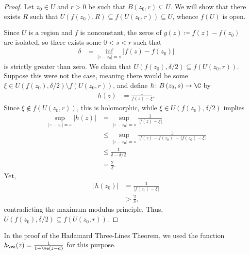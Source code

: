 \documentclass[10pt]{mypackage}
\begin{document}
\begin{proof}
  Let $z_0\in U$ and $r > 0$ be such that $ B\left( z_0,r \right)\subseteq U $. We will show that there exists $R$ such that $U\left( f\left( z_0 \right),R \right)\subseteq f\left( U\left( z_0,r \right) \right)\subseteq U$, whence $f(U)$ is open.\newline

  Since $U$ is a region and $f$ is nonconstant, the zeros of $g(z)\coloneq f(z) - f\left( z_0 \right)$ are isolated, so there exists some $0 < s < r$ such that
  \begin{align*}
    \delta &= \inf_{\left\vert z-z_0 \right\vert = s} \left\vert f(z)-f\left( z_0 \right) \right\vert
  \end{align*}
  is strictly greater than zero. We claim that $U\left( f\left( z_0 \right),\delta/2 \right) \subseteq f\left( U\left( z_0,r \right) \right)$. Suppose this were not the case, meaning there would be some $\xi\in U\left( f\left( z_0 \right),\delta/2 \right)\setminus f\left( U\left( z_0,r \right) \right)$, and define $ h\colon B\left( z_0,s \right)\rightarrow \C $ by
  \begin{align*}
    h(z) &= \frac{1}{f\left( z \right) - \xi}.
  \end{align*}
  Since $\xi\notin f\left( U\left( z_0,r \right) \right)$, this is holomorphic, while $\xi\in U\left( f\left( z_0 \right),\delta/2 \right)$ implies
  \begin{align*}
    \sup_{\left\vert z-z_0 \right\vert = s} \left\vert h(z) \right\vert &= \sup_{\left\vert z-z_0 \right\vert = s} \frac{1}{\left\vert f\left( z \right) - \xi \right\vert}\\
                                                                        &\leq \sup_{\left\vert z-z_0 \right\vert = s} \frac{1}{\left\vert f\left( z \right)-f\left( z_0 \right) \right\vert - \left\vert f\left( z_0 \right) - \xi \right\vert}\\
                                                                        &\leq \frac{1}{\delta - \delta/2}\\
                                                                        &= \frac{2}{\delta}.
  \end{align*}
  Yet,
  \begin{align*}
    \left\vert h\left( z_0 \right) \right\vert &= \frac{1}{\left\vert f\left( z_0 \right) - \xi \right\vert}\\
                                               &> \frac{2}{\delta},
  \end{align*}
  contradicting the maximum modulus principle. Thus, $U\left( f\left( z_0 \right),\delta/2 \right)\subseteq f\left( U\left( z_0,r \right) \right)$.
\end{proof}
In the proof of the Hadamard Three-Lines Theorem, we used the function $h_{\ve}(z) = \frac{1}{ 1 + \ve (z-a) }$ for this purpose.
\end{document}
